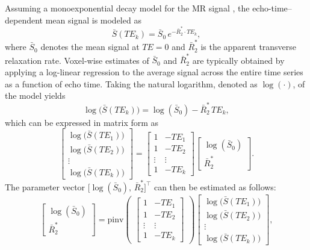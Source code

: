 Assuming a monoexponential decay model for the MR signal \citep{posse1999enhancement,poser2006bold}, the echo-time–dependent mean signal is modeled as
\[
\bar{S}(TE_k) = \bar{S}_0 \, e^{-\bar{R}_2^* \cdot TE_k},
\]
where \(\bar{S}_0\) denotes the mean signal at \(TE = 0\) and \(\bar{R}_2^*\) is the apparent transverse relaxation rate. Voxel-wise estimates of \(\bar{S}_0\) and \(\bar{R}_2^*\) are typically obtained by applying a log-linear regression to the average signal across the entire time series as a function of echo time. Taking the natural logarithm, denoted as \(\log(\cdot)\), of the model yields
\[
\log\big(\bar{S}(TE_k)\big) = \log(\bar{S}_0) - \bar{R}_2^* \, TE_k,
\]
which can be expressed in matrix form as
\begin{equation}
    \begin{bmatrix}
        \log\big(\bar{S}(TE_1)\big) \\
        \log\big(\bar{S}(TE_2)\big) \\
        \vdots \\
        \log\big(\bar{S}(TE_k)\big)
    \end{bmatrix}
    =
    \begin{bmatrix}
        1 & -TE_1 \\
        1 & -TE_2 \\
        \vdots & \vdots \\
        1 & -TE_k
    \end{bmatrix}
    \begin{bmatrix}
        \log(\bar{S}_0) \\
        \bar{R}_2^*
    \end{bmatrix}.
\end{equation}
The parameter vector \(\big[\log(\bar{S}_0),\, \bar{R}_2^*\big]^\top\) can then be estimated as follows:
\begin{equation}
    \begin{bmatrix}
        \log(\bar{S}_0) \\
        \bar{R}_2^*
    \end{bmatrix}
    =
    \mathrm{pinv}
    \begin{pmatrix}
        \begin{bmatrix}
            1 & -TE_1 \\
            1 & -TE_2 \\
            \vdots & \vdots \\
            1 & -TE_k
        \end{bmatrix}
    \end{pmatrix}
    \begin{bmatrix}
        \log\big(\bar{S}(TE_1)\big) \\
        \log\big(\bar{S}(TE_2)\big) \\
        \vdots \\
        \log\big(\bar{S}(TE_k)\big)
    \end{bmatrix},
\end{equation}
